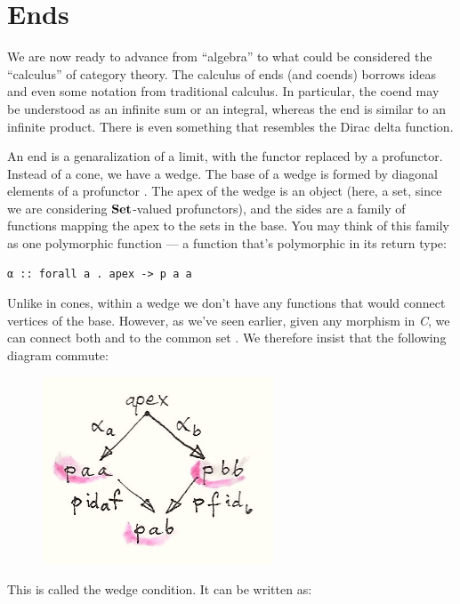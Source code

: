 \section{Ends}\label{ends}

We are now ready to advance from ``algebra'' to what could be considered
the ``calculus'' of category theory. The calculus of ends (and coends)
borrows ideas and even some notation from traditional calculus. In
particular, the coend may be understood as an infinite sum or an
integral, whereas the end is similar to an infinite product. There is
even something that resembles the Dirac delta function.

An end is a genaralization of a limit, with the functor replaced by a
profunctor. Instead of a cone, we have a wedge. The base of a wedge is
formed by diagonal elements of a profunctor . The apex of the
wedge is an object (here, a set, since we are considering
$\mathbf{Set}$-valued profunctors), and the sides are a family of
functions mapping the apex to the sets in the base. You may think of
this family as one polymorphic function --- a function that's
polymorphic in its return type:

\begin{Verbatim}[commandchars=\\\{\}]
α :: forall a . apex -> p a a
\end{Verbatim}
Unlike in cones, within a wedge we don't have any functions that would
connect vertices of the base. However, as we've seen earlier, given any
morphism  in \emph{C}, we can connect both
 and  to the common set
. We therefore insist that the following diagram
commute:

\begin{figure}[H]
\centering
\includegraphics[width=2.69792in]{images/end-2.jpg}
\end{figure}

\noindent
This is called the wedge condition. It can be written as:

